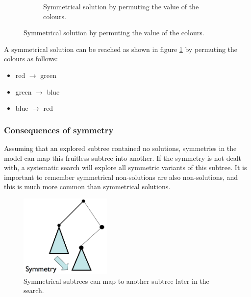 \documentclass[CS4402-Notes.tex]{subfiles}
\begin{document}
\begin{figure}[H]
\begin{subfigure}{0.42\textwidth}
  \caption{Symmetrical solution by permuting the value of the colours.}
\end{subfigure}
\label{fig:graph-colouring}
\end{figure}
\noindent
A symmetrical solution can be reached as shown in figure \ref{fig:graph-colouring} by permuting the colours as follows:
\begin{itemize}
\item red $\rightarrow$ green
\item green $\rightarrow$ blue
\item blue $\rightarrow$ red
\end{itemize}

\subsubsection{Consequences of symmetry}
Assuming that an explored subtree contained no solutions, symmetries in the model can map this fruitless subtree into another. If the symmetry is not dealt with, a systematic search will explore all symmetric variants of this subtree. It is important to remember symmetrical non-solutions are also non-solutions, and this is much more common than symmetrical solutions.
\begin{figure}[H]
  \centering
  \includegraphics[width=0.4\textwidth, keepaspectratio]{imgs/symmetrical-subtree.png}
  \caption{Symmetrical subtrees can map to another subtree later in the search.}
\end{figure}
\end{document}
